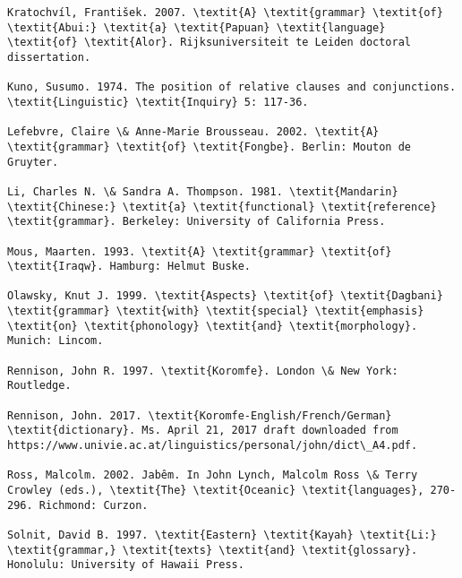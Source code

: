 \documentclass[output=paper]{langsci/langscibook}
\begin{document}
\begin{verbatim}
Kratochvíl, František. 2007. \textit{A} \textit{grammar} \textit{of} \textit{Abui:} \textit{a} \textit{Papuan} \textit{language} \textit{of} \textit{Alor}. Rijksuniversiteit te Leiden doctoral dissertation.

Kuno, Susumo. 1974. The position of relative clauses and conjunctions. \textit{Linguistic} \textit{Inquiry} 5: 117-36. 

Lefebvre, Claire \& Anne-Marie Brousseau. 2002. \textit{A} \textit{grammar} \textit{of} \textit{Fongbe}. Berlin: Mouton de Gruyter.

Li, Charles N. \& Sandra A. Thompson. 1981. \textit{Mandarin} \textit{Chinese:} \textit{a} \textit{functional} \textit{reference} \textit{grammar}. Berkeley: University of California Press.

Mous, Maarten. 1993. \textit{A} \textit{grammar} \textit{of} \textit{Iraqw}. Hamburg: Helmut Buske.

Olawsky, Knut J. 1999. \textit{Aspects} \textit{of} \textit{Dagbani} \textit{grammar} \textit{with} \textit{special} \textit{emphasis} \textit{on} \textit{phonology} \textit{and} \textit{morphology}. Munich: Lincom.

Rennison, John R. 1997. \textit{Koromfe}. London \& New York: Routledge.

Rennison, John. 2017. \textit{Koromfe-English/French/German} \textit{dictionary}. Ms. April 21, 2017 draft downloaded from https://www.univie.ac.at/linguistics/personal/john/dict\_A4.pdf.

Ross, Malcolm. 2002. Jabêm. In John Lynch, Malcolm Ross \& Terry Crowley (eds.), \textit{The} \textit{Oceanic} \textit{languages}, 270-296. Richmond: Curzon.

Solnit, David B. 1997. \textit{Eastern} \textit{Kayah} \textit{Li:} \textit{grammar,} \textit{texts} \textit{and} \textit{glossary}. Honolulu: University of Hawaii Press.


\end{verbatim}
\end{document}

